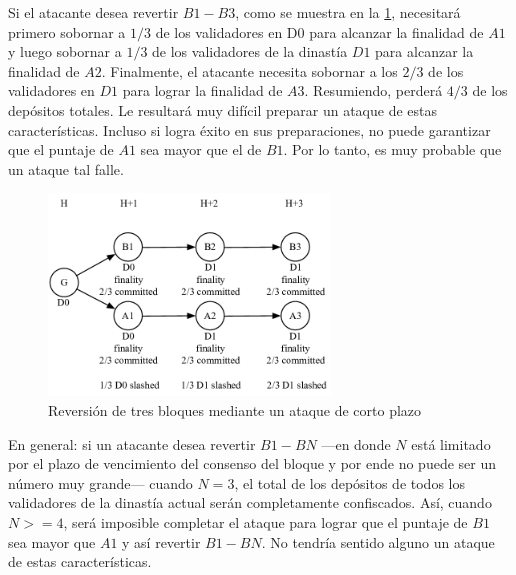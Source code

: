 Si el atacante desea revertir $B1-B3$, como se muestra en la \ref{fig:revert3}, necesitará primero sobornar a $1/3$ de los validadores en D0 para alcanzar la finalidad de $A1$ y luego sobornar a $1/3$ de los validadores de la dinastía $D1$ para alcanzar la finalidad de $A2$. Finalmente, el atacante necesita sobornar a los $2/3$ de los validadores en $D1$ para lograr la finalidad de $A3$. Resumiendo, perderá $4/3$ de los depósitos totales. Le resultará muy difícil preparar un ataque de estas características. Incluso si logra éxito en sus preparaciones, no puede garantizar que el puntaje de $A1$ sea mayor que el de $B1$. Por lo tanto, es muy probable que un ataque tal falle.

\begin{figure}[h]
\centering
\includegraphics[width=7.5cm]{./figs/revert3}
\caption{Reversión de tres bloques mediante un ataque de corto plazo}
\label{fig:revert3}
\end{figure}

En general: si un atacante desea revertir $B1-BN$ —en donde $N$ está limitado por el plazo de vencimiento del consenso del bloque y por ende no puede ser un número muy grande— cuando $N = 3$, el total de los depósitos de todos los validadores de la dinastía actual serán completamente confiscados. Así, cuando $N >= 4$, será imposible completar el ataque para lograr que el puntaje de $B1$ sea mayor que $A1$ y así revertir $B1-BN$. No tendría sentido alguno un ataque de estas características.